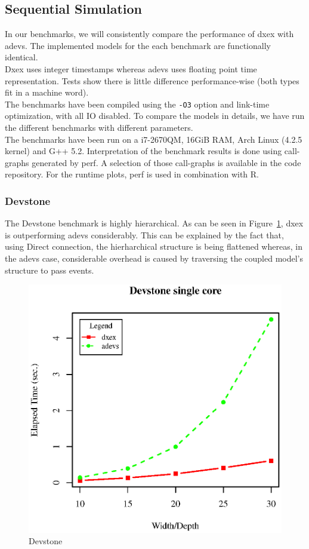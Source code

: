 \subsection{Sequential Simulation}
In our benchmarks, we will consistently compare the performance of dxex with adevs. The implemented models for the each benchmark are functionally identical.\\
Dxex uses integer timestamps whereas adevs uses floating point time representation. Tests show there is little difference performance-wise (both types fit in a machine word).\\
The benchmarks have been compiled using the {\tt -O3} option and link-time optimization, with all IO disabled. To compare the models in details, we have run the different benchmarks with different parameters.\\
The benchmarks have been run on a i7-2670QM, 16GiB RAM, Arch Linux (4.2.5 kernel) and G++ 5.2. Interpretation of the benchmark results is done using call-graphs generated by perf. A selection of those call-graphs is available in the code repository. For the runtime plots, perf is used in combination with R.\\
\subsubsection{Devstone}
The Devstone \cite{DEVStone} benchmark is highly hierarchical. As can be seen in Figure~\ref{fig:Devstone}, dxex is outperforming adevs considerably. This can be explained by the fact that, using Direct connection, the hierharchical structure is being flattened whereas, in the adevs case, considerable overhead is caused by traversing the coupled model's structure to pass events.
\begin{figure}[h]
	\includegraphics[width=.5\textwidth]{fig/fig1.eps}
	\caption{Devstone}
	\label{fig:Devstone}
\end{figure}

